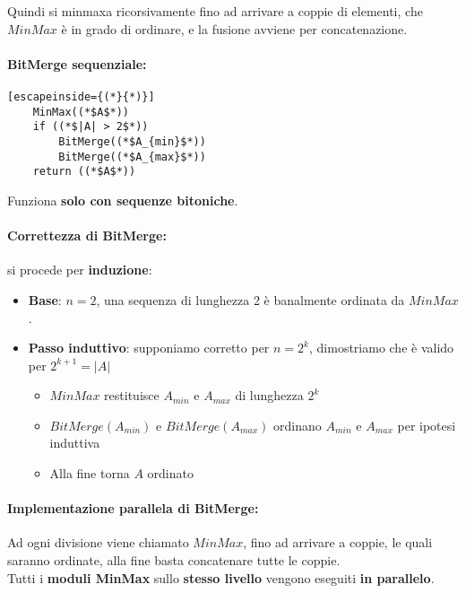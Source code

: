 Quindi si minmaxa ricorsivamente fino ad arrivare a coppie di elementi, che $MinMax$ è in grado di ordinare, e la fusione avviene per concatenazione.\\

\newpage

\paragraph{BitMerge sequenziale: } \hfill

\begin{lstlisting}[escapeinside={(*}{*)}]
	MinMax((*$A$*))
	if ((*$|A| > 2$*))
		BitMerge((*$A_{min}$*))
		BitMerge((*$A_{max}$*))
	return ((*$A$*))
\end{lstlisting}

Funziona \textbf{solo con sequenze bitoniche}.\\

\paragraph{Correttezza di BitMerge:} si procede per \textbf{induzione}:
\begin{itemize}
	\item \textbf{Base}: $n=2$, una sequenza di lunghezza 2 è banalmente ordinata da $MinMax$.\\
	
	\item \textbf{Passo induttivo}: supponiamo corretto per $n=2^k$, dimostriamo che è valido per $2^{k+1} = |A|$
	\begin{itemize}
		\item $MinMax$ restituisce $A_{min}$ e $A_{max}$ di lunghezza $2^k$
		\item $BitMerge(A_{min})$ e $BitMerge(A_{max})$ ordinano $A_{min}$ e $A_{max}$ per ipotesi induttiva
		\item Alla fine torna $A$ ordinato
	\end{itemize}
	\nn
\end{itemize}

\paragraph{Implementazione parallela di BitMerge:} Ad ogni divisione viene chiamato $MinMax$, fino ad arrivare a coppie, le quali saranno ordinate, alla fine basta concatenare tutte le coppie.\\

Tutti i \textbf{moduli MinMax} sullo \textbf{stesso livello} vengono eseguiti \textbf{in parallelo}.\\

